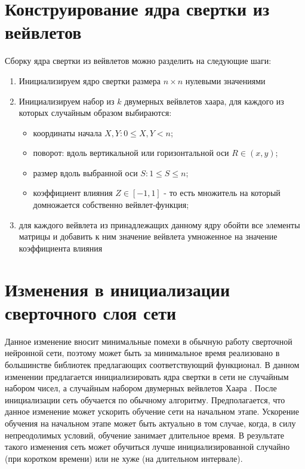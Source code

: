 \documentclass[utf8,usehyperref,14pt]{G7-32}
\begin{document}
\section{Конструирование ядра свертки из вейвлетов}
Сборку ядра свертки из вейвлетов можно разделить на следующие шаги:
\begin{enumerate}
\item Инициализируем ядро свертки размера $ n \times n $ нулевыми значениями
\item Инициализируем набор из $ k $ двумерных вейвлетов хаара, для каждого из которых случайным образом выбираются:
\begin{itemize}
\item координаты начала $X, Y : 0 \leq X, Y < n$;
\item поворот: вдоль вертикальной или горизонтальной оси $R \in (x, y)$;
\item размер вдоль выбранной оси $ S: 1 \leq S \leq n $;
\item коэффициент влияния $ Z \in [-1, 1] $ - то есть множитель на который домножается собственно вейвлет-функция;
\end{itemize}
\item для каждого вейвлета из принадлежащих данному ядру обойти все элементы матрицы и добавить к ним значение вейвлета умноженное на значение коэффициента влияния
\end{enumerate}

\section{Изменения в инициализации сверточного слоя сети}
Данное изменение вносит минимальные помехи в обычную работу сверточной нейронной сети, поэтому может быть за минимальное время реализовано в большинстве библиотек предлагающих соответствующий функционал. В данном изменении предлагается инициализировать ядра свертки в сети не случайным набором чисел, а случайным набором двумерных вейвлетов Хаара \cite{chui, wavelet}. После инициализации сеть обучается по обычному алгоритму. Предполагается, что данное изменение может ускорить обучение сети на начальном этапе. Ускорение обучения на начальном этапе может быть актуально в том случае, когда, в силу непреодолимых условий, обучение занимает длительное время. В результате такого изменения сеть может обучиться лучше инициализированной случайно (при коротком времени) или не хуже (на длительном интервале).
\end{document}

